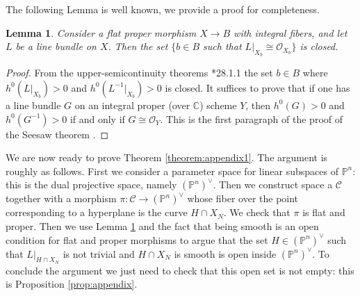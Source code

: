 \documentclass[11pt]{article} %
\newtheorem{lemma}[theorem]{Lemma}
\theoremstyle{definition}
\newcommand{\cC}{{\mathcal{C}}}
\newcommand{\cO}{{\mathcal{O}}}
\begin{document}
The following Lemma is well known, we provide a proof for completeness.
\begin{lemma}\label{lemma:being:a:trivial:line:bundle:is:closed}
Consider a flat proper morphism $X\to B$ with integral fibers, and let $L$ be a line bundle on $X$. Then the set $\{b\in B$ such that $L|_{X_b}\cong \cO_{X_b}\}$ is closed.
\end{lemma}
\begin{proof}
From the upper-semicontinuity theorems \cite{Vak17}*{28.1.1} the set $b\in B$ where $h^0(L|_{X_b})>0$ and $h^0(L^{-1}|_{X_b})>0$ is closed. It suffices to prove that if one has a line bundle $G$ on an integral proper (over $\mathbb{C}$) scheme $Y$, then $h^0(G)>0$ and $h^0(
G^{-1})>0$ if and only if $G\cong \cO_Y$.
This is the first paragraph of the proof of the Seesaw theorem \cite{Mum74}.
\end{proof}

We are now ready to prove Theorem \ref{theorem:appendix1}. The argument is roughly as follows. First we consider a parameter space for linear subspaces of $\mathbb{P}^n$: this is the dual projective space, namely $(\mathbb{P}^n)^{\vee}$. Then we construct space a $\cC$ together with a morphism $\pi:\mathcal{C}\to (\mathbb{P}^n)^{\vee}$ whose fiber over the point corresponding to a hyperplane is the curve $H\cap X_{N}$.  We check that $\pi$ is flat and proper.
Then we use Lemma \ref{lemma:being:a:trivial:line:bundle:is:closed} and the fact that being smooth is an open condition for flat and proper morphisms to argue that the set $H\in (\mathbb{P}^n)^{\vee}$ such that $L|_{H\cap X_{N}}$ is not trivial and $H\cap X_{N}$ is smooth is open inside $(\mathbb{P}^n)^{\vee}$. To conclude the argument we just need to check that this open set is not empty: this is Proposition \ref{prop:appendix}.
\end{document}
